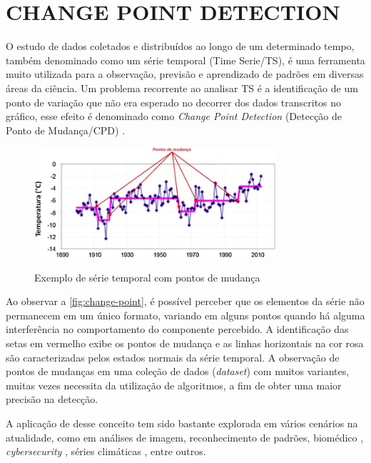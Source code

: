 \section{CHANGE POINT DETECTION}
\label{sec:changePointDetection}

O estudo de dados coletados e distribuídos ao longo de um determinado tempo, também denominado como um série temporal (Time Serie/TS), é uma ferramenta muito utilizada para a observação, previsão e aprendizado de padrões em diversas áreas da ciência. Um problema recorrente ao analisar TS é a identificação de um ponto de variação que não era esperado no decorrer dos dados transcritos no gráfico, esse efeito é denominado como \textit{Change Point Detection} (Detecção de Ponto de Mudança/CPD) \cite{Aminikhanghahi2017}.

\begin{figure}[!htb]
    \centering
    \caption{Exemplo de série temporal com pontos de mudança}
    \includegraphics[width=0.8\textwidth]{./dados/figuras/pontos-de-mudanca}
    \label{fig:change-point}
\end{figure}

Ao observar a \autoref{fig:change-point}, é possível perceber que os elementos da série não permanecem em um único formato, variando em alguns pontos quando há alguma interferência no comportamento do componente percebido. A identificação das setas em vermelho exibe os pontos de mudança e as linhas horizontais na cor rosa são caracterizadas pelos estados normais da série temporal. A observação de pontos de mudanças em uma coleção de dados (\textit{dataset}) com muitos variantes, muitas vezes necessita da utilização de algoritmos, a fim de obter uma maior precisão na detecção. 

A aplicação de desse conceito tem sido bastante explorada em vários cenários na atualidade, como em análises de imagem, reconhecimento de padrões, biomédico \cite{Fan2015}, \textit{cybersecurity} \cite{Polunchenko2012}, séries climáticas \cite{Bates2012}, entre outros. 

